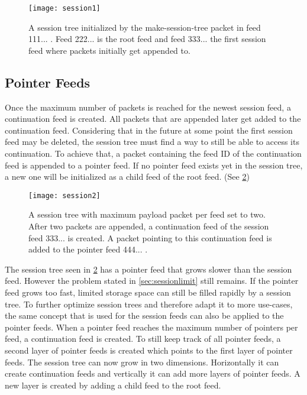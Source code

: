 \begin{figure}
\centering
\texttt{[image: session1]}
\caption{A session tree initialized by the make-session-tree packet in feed 111... . Feed 222... is the root feed and feed 333... the first session feed where packets initially get appended to.}
\label{fig:session1}
\end{figure}

\subsection{Pointer Feeds}
Once the maximum number of packets is reached for the newest session feed, a continuation feed is created. All packets that are appended later get added to the continuation feed. Considering that in the future at some point the first session feed may be deleted, the session tree must find a way to still be able to access its continuation. To achieve that, a packet containing the feed ID of the continuation feed is appended to a pointer feed. If no pointer feed exists yet in the session tree, a new one will be initialized as a child feed of the root feed. (See \cref{fig:session2})

\begin{figure}
\centering
\texttt{[image: session2]}
\caption{A session tree with maximum payload packet per feed set to two. After two packets are appended, a continuation feed of the session feed 333... is created. A packet pointing to this continuation feed is added to the pointer feed 444... .}
\label{fig:session2}
\end{figure}

The session tree seen in \cref{fig:session2} has a pointer feed that grows slower than the session feed. However the problem stated in \cref{sec:sessionlimit} still remains. If the pointer feed grows too fast, limited storage space can still be filled rapidly by a session tree. To further optimize session trees and therefore adapt it to more use-cases, the same concept that is used for the session feeds can also be applied to the pointer feeds. When a pointer feed reaches the maximum number of pointers per feed, a continuation feed is created. To still keep track of all pointer feeds, a second layer of pointer feeds is created which points to the first layer of pointer feeds. The session tree can now grow in two dimensions. Horizontally it can create continuation feeds and vertically it can add more layers of pointer feeds. A new layer is created by adding a child feed to the root feed. 


